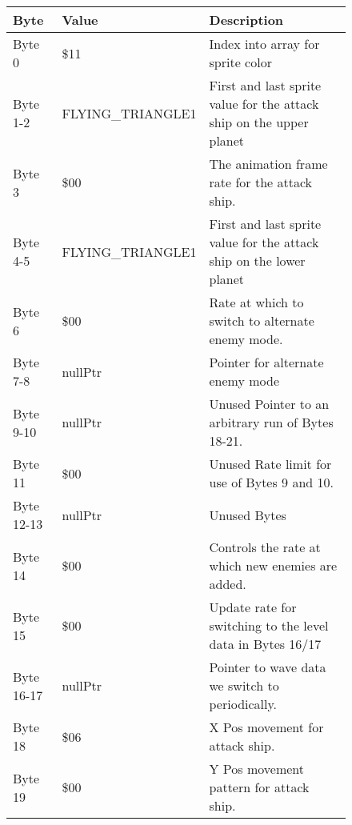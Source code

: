 \begin{figure}[H]
  {
  \setlength{\tabcolsep}{3.0pt}
  \setlength\cmidrulewidth{\heavyrulewidth} %
  \begin{adjustbox}{width=12cm}

\begin{tabular}{lll}
\toprule
 Byte       & Value                     & Description                                                         \\
\midrule
 Byte 0     & \$11                       & Index into array for sprite color                                   \\
 Byte 1-2   & FLYING\_TRIANGLE1          & First and last sprite value for the attack ship on the upper planet \\
 Byte 3     & \$00                       & The animation frame rate for the attack ship.                       \\
 Byte 4-5   & FLYING\_TRIANGLE1          & First and last sprite value for the attack ship on the lower planet \\
 Byte 6     & \$00                       & Rate at which to switch to alternate enemy mode.                    \\
 Byte 7-8   & nullPtr                   & Pointer for alternate enemy mode                                    \\
 Byte 9-10  & nullPtr                   & Unused Pointer to an arbitrary run of Bytes 18-21.                  \\
 Byte 11    & \$00                       & Unused Rate limit for use of Bytes 9 and 10.                        \\
 Byte 12-13 & nullPtr                   & Unused Bytes                                                        \\
 Byte 14    & \$00                       & Controls the rate at which new enemies are added.                   \\
 Byte 15    & \$00                       & Update rate for switching to the level data in Bytes 16/17          \\
 Byte 16-17 & nullPtr                   & Pointer to wave data we switch to periodically.                     \\
 Byte 18    & \$06                       & X Pos movement for attack ship.                                     \\
 Byte 19    & \$00                       & Y Pos movement pattern for attack ship.                             \\

\end{tabular}
\end{adjustbox}}
\end{figure}
